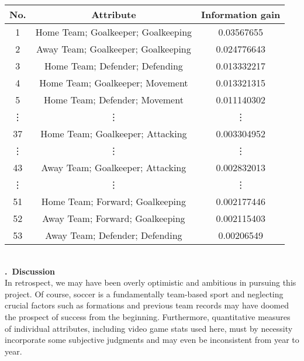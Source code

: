 \documentclass[a4paper,11pt,table]{article}
\renewcommand{\section}[1]{\stepcounter{section}\noindent\textbf{\arabic{section}.~#1}\\}
\begin{document}
\begin{center}
    \begin{tabular}{|c|c|c|}
        \hline
        No. &   Attribute                           &   Information gain \\
        \hline
        1   &   Home Team; Goalkeeper; Goalkeeping  &   0.03567655 \\
        \hline
        2   &   Away Team; Goalkeeper; Goalkeeping  &   0.024776643 \\
        \hline
        3   &   Home Team; Defender; Defending      &   0.013332217 \\
        \hline
        4   &   Home Team; Goalkeeper; Movement     &   0.013321315 \\
        \hline
        5   &   Home Team; Defender; Movement       &   0.011140302 \\
        \hline
        \vdots  &   \vdots  &   \vdots \\
        \hline
        37  &   Home Team; Goalkeeper; Attacking    &   0.003304952 \\
        \hline
        \vdots  &   \vdots  &   \vdots \\
        \hline
        43  &   Away Team; Goalkeeper; Attacking    &   0.002832013 \\
        \hline
        \vdots  &   \vdots  &   \vdots \\
        \hline
        51  &   Home Team; Forward; Goalkeeping     &   0.002177446 \\
        \hline
        52  &   Away Team; Forward; Goalkeeping     &   0.002115403 \\
        \hline
        53  &   Away Team; Defender; Defending      &   0.00206549 \\
        \hline
    \end{tabular}
\end{center}
~\\
\section{Discussion}

In retrospect, we may have been overly optimistic and ambitious in pursuing this project. Of course, soccer is a fundamentally team-based sport and neglecting crucial factors such as formations and previous team records may have doomed the prospect of success from the beginning. Furthermore, quantitative measures of individual attributes, including video game stats used here, must by necessity incorporate some subjective judgments and may even be inconsistent from year to year.
\end{document}
